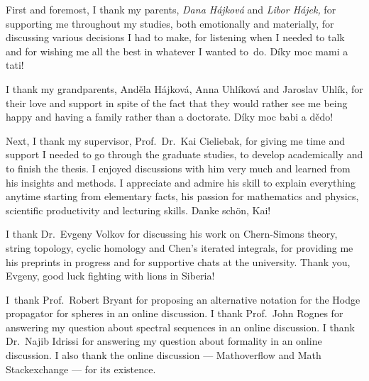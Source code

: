 \documentclass[\MainFolder/Text.tex]{subfiles}
\begin{document}

First and foremost, I thank my parents, \emph{Dana H\'ajkov\'a} and \emph{Libor H\'ajek,} for supporting me throughout my studies, both emotionally and materially, for discussing various decisions I had to make, for listening when I needed to talk and for wishing me all the best in whatever I wanted to~do.
D\'iky moc mami a tati!

I thank my grandparents,  And\v{e}la H\'ajkov\'a, Anna Uhl\'ikov\'a and Jaroslav Uhl\'ik, for their love and support in spite of the fact that they would rather see me being happy and having a family rather than a doctorate. D\'iky moc babi a d\v{e}do! 

Next, I thank my supervisor, Prof.~Dr.~Kai Cieliebak, for giving me time and support I needed to go through the graduate studies, to develop academically and to finish the thesis. I enjoyed discussions with him very much and learned from his insights and methods. I appreciate and admire his skill to explain everything anytime starting from elementary facts, his passion for mathematics and physics, scientific productivity and lecturing skills. Danke sch\"on, Kai!



I thank Dr.~Evgeny Volkov for discussing his work on Chern-Simons theory, string topology, cyclic homology and Chen's iterated integrals, for providing me his preprints in progress and for supportive chats at the university. Thank you, Evgeny, good luck fighting with lions in Siberia!

I~thank Prof.~Robert Bryant for proposing an alternative notation for the Hodge propagator for spheres in an online discussion. I thank Prof.~John Rognes for answering my question about spectral sequences in an online discussion. I thank Dr.~Najib Idrissi for answering my question about formality in an online discussion. I also thank the online discussion --- Mathoverflow and Math Stackexchange --- for its existence.
\end{document}
